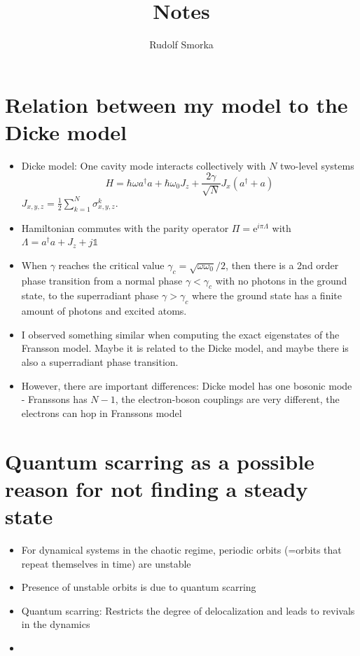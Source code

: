 \documentclass{article}
\newcommand{\exP}[1]{\mathrm{e}^{#1}}
\begin{document}
\title{Notes}
\author{Rudolf Smorka}
\maketitle
\section{Relation between my model to the Dicke model}
\begin{itemize}
	\item Dicke model: One cavity mode interacts collectively with $N$ two-level systems
	\begin{equation*}
		H = \hbar \omega a^\dagger a + \hbar \omega_0 J_z + \frac{2\gamma}{\sqrt{N}}J_x(a^\dagger + a)
	\end{equation*}
	$J_{x,y,z} = \frac{1}{2}\sum_{k=1}^N \sigma_{x,y,z}^k$.
	\item Hamiltonian commutes with the parity operator $\Pi = \exP{i\pi\Lambda}$ with $\Lambda = a^\dagger a + J_z + j\mathds{1}$
	\item When $\gamma$ reaches the critical value $\gamma_c=\sqrt{\omega \omega_0}/2$, then there is a 2nd order phase transition from a normal phase $\gamma<\gamma_c$ with no photons in the ground state, to the superradiant phase $\gamma>\gamma_c$ where the ground state has a finite amount of photons and excited atoms.
	\item I observed something similar when computing the exact eigenstates of the Fransson model. Maybe it is related to the Dicke model, and maybe there is also a superradiant phase transition.
	\item However, there are important differences: Dicke model has one bosonic mode -  Franssons has $N-1$, the electron-boson couplings are very different, the electrons can hop in Franssons model
\end{itemize}
\section{Quantum scarring as a possible reason for not finding a steady state}
\begin{itemize}
	\item For dynamical systems in the chaotic regime, periodic orbits (=orbits that repeat themselves in time) are unstable
	\item Presence of unstable orbits is due to quantum scarring
	\item Quantum scarring: Restricts the degree of delocalization and leads to revivals in the dynamics
	\item 
\end{itemize}
\end{document}
